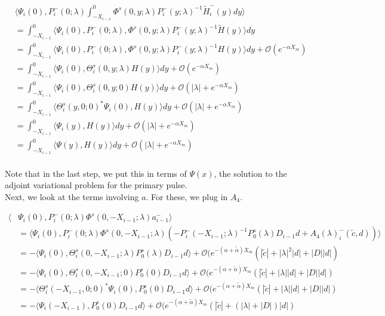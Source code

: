 \documentclass[12pt]{article}
\begin{document}
\begin{align*}
&\langle \Psi_i(0), P_i^-(0; \lambda) \int_{-X_{i-1}}^0 \Phi^s(0, y; \lambda) P_i^-(y; \lambda)^{-1} \tilde{H}_i^-(y) dy \rangle \\
&= \int_{-X_{i-1}}^0 \langle \Psi_i(0), P_i^-(0; \lambda), \Phi^s(0, y; \lambda) P_i^-(y; \lambda)^{-1} \tilde{H}(y) \rangle dy \\
&= \int_{-X_{i-1}}^0 \langle \Psi_i(0), P_i^-(0; \lambda), \Phi^s(0, y; \lambda) P_i^-(y; \lambda)^{-1} H(y) \rangle dy + \mathcal{O}({e^{-\alpha X_m}})\\
&= \int_{-X_{i-1}}^0 \langle \Psi_i(0), \Theta_i^s(0, y; \lambda) H(y) \rangle dy + \mathcal{O}({e^{-\alpha X_m}})\\
&= \int_{-X_{i-1}}^0 \langle \Psi_i(0), \Theta_i^s(0, y; 0) H(y) \rangle dy + \mathcal{O}(|\lambda| + {e^{-\alpha X_m}})\\
&= \int_{-X_{i-1}}^0 \langle \Theta_i^s(y, 0; 0)^* \Psi_i(0), H(y) \rangle dy + \mathcal{O}(|\lambda| + {e^{-\alpha X_m}})\\
&= \int_{-X_{i-1}}^0 \langle \Psi_i(y), H(y) \rangle dy + \mathcal{O}(|\lambda| + {e^{-\alpha X_m}})\\
&= \int_{-X_{i-1}}^0 \langle \Psi(y), H(y) \rangle dy + \mathcal{O}(|\lambda| + {e^{-\alpha X_m}})\\
\end{align*}

Note that in the last step, we put this in terms of $\Psi(x)$, the solution to the adjoint variational problem for the primary pulse.\\

Next, we look at the terms involving $a$. For these, we plug in $A_4$.

\begin{align*}
\langle &\Psi_i(0), P_i^-(0; \lambda) \Phi^s(0, -X_{i-1}; \lambda) a_{i-1}^- \rangle \\
&= \langle \Psi_i(0), P_i^-(0; \lambda) \Phi^s(0, -X_{i-1}; \lambda) (- P_i^-(-X_{i-1}; \lambda)^{-1} P_0^s(\lambda) D_{i-1} d + A_4(\lambda)_i^-(\tilde{c}, d)) \rangle \\
&= -\langle \Psi_i(0), \Theta_i^s(0, -X_{i-1}; \lambda) P_0^s(\lambda) D_{i-1} d \rangle + \mathcal{O}( e^{-(\alpha + \tilde{\alpha})X_m}(|\tilde{c}| + |\lambda|^2 |d| + |D||d|) \\
&= -\langle \Psi_i(0), \Theta_i^s(0, -X_{i-1}; 0) P_0^s(0) D_{i-1} d \rangle + \mathcal{O}( e^{-(\alpha + \tilde{\alpha})X_m}(|\tilde{c}| + |\lambda||d| + |D||d|) \\
&= -\langle \Theta_i^s(-X_{i-1}, 0; 0)^* \Psi_i(0), P_0^s(0) D_{i-1} d \rangle + \mathcal{O}( e^{-(\alpha + \tilde{\alpha})X_m}(|\tilde{c}| + |\lambda||d| + |D||d|) \\
&= -\langle \Psi_i(-X_{i-1}), P_0^s(0) D_{i-1} d \rangle + \mathcal{O}( e^{-(\alpha + \tilde{\alpha})X_m}(|\tilde{c}| + (|\lambda| + |D|)|d|) \\
\end{align*}
\end{document}
